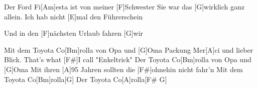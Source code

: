 \begin{guitar}
	\begin{highlightbar}
		Der Ford Fi[Am]esta ist von meiner [F]Schwester
		Sie war das [G]wirklich ganz allein. Ich hab nicht [E]mal den Führerschein
	\end{highlightbar}
	
	Und in den [F]nächsten Urlaub fahren [G]wir
	
	Mit dem Toyota Co[Bm]rolla von Opa und [G]Oma
	Packung Mer[A]ci und lieber Blick. That's what [F#]I call "Enkeltrick"
	Der Toyota Co[Bm]rolla von Opa und [G]Oma
	Mit ihren [A]95 Jahren sollten die [F#]ohnehin nicht fahr'n	
	Mit dem Toyota Co[Bm]rolla[G]{}
	Der Toyota Co[A]rolla[F# G]{}
\end{guitar}